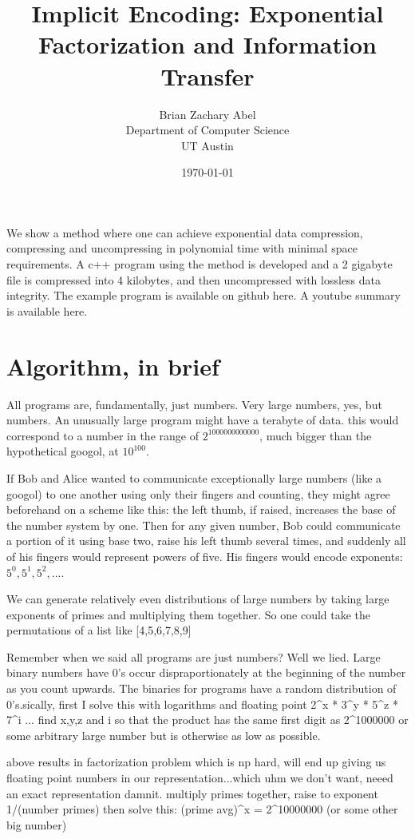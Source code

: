 \documentclass[12pt]{article}
\title{Implicit Encoding: Exponential Factorization and Information Transfer}
\author{
Brian Zachary Abel\\
Department of Computer Science\\
UT Austin\\
\date{\today}
}
\begin{document}
\maketitle

\abstract
We show a method where one can achieve exponential data compression,
compressing and uncompressing in polynomial time with minimal space requirements.
A c++ program using the method is developed and a 2 gigabyte file is compressed
into 4 kilobytes, and then uncompressed with lossless data integrity.
The example program is available on github here.
A youtube summary is available here.

\section*{Algorithm, in brief}
All programs are, fundamentally, just numbers. Very large numbers, yes,
but numbers. An unusually large program might have a terabyte of data.
this would correspond to a number in the range of $2^{1000000000000}$,
much bigger than the hypothetical googol, at $10^{100}$.

If Bob and Alice wanted to communicate exceptionally large numbers (like a googol)
to one another using only their fingers and counting,
they might agree beforehand on a scheme like this:
the left thumb, if raised, increases the base of the number system by one. Then
for any given number, Bob could communicate a portion of it using base two, raise his
left thumb several times, and suddenly all of his fingers would represent powers of five.
His fingers would encode exponents: $5^{0},5^{1},5^{2},...$.

We can generate relatively even distributions of large numbers by taking large exponents
of primes and multiplying them together. So one could take the permutations of a list like
[4,5,6,7,8,9]

Remember when we said all programs are just numbers? Well we lied.
Large binary numbers have 0's occur dispraportionately at the beginning of the number
as you count upwards. The binaries for programs have a random distribution of 0's.sically, first I  solve this with logarithms and floating point
2^x * 3^y * 5^z * 7^i ...
find x,y,z and i so that the product has the same first digit as
2^1000000 or some arbitrary large number
but is otherwise as low as possible.

above results in factorization problem which is np hard, will end up giving us
floating point numbers in our representation...which uhm we don't want,
neeed an exact representation damnit.
multiply primes together, raise to exponent 1/(number primes)
then solve this:
(prime avg)^x = 2^10000000 (or some other big number)
\end{document}
